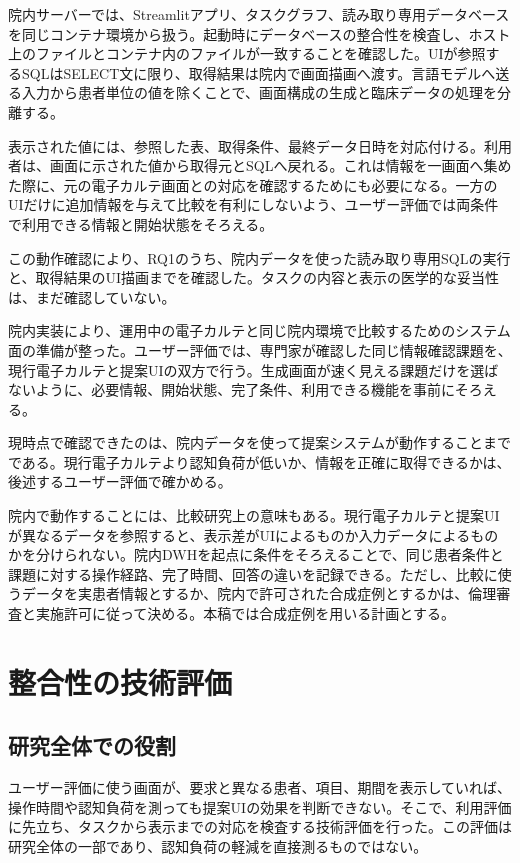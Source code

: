 \documentclass[a4paper]{jsarticle}
\begin{document}
院内サーバーでは、Streamlitアプリ、タスクグラフ、読み取り専用データベースを同じコンテナ環境から扱う。起動時にデータベースの整合性を検査し、ホスト上のファイルとコンテナ内のファイルが一致することを確認した。UIが参照するSQLはSELECT文に限り、取得結果は院内で画面描画へ渡す。言語モデルへ送る入力から患者単位の値を除くことで、画面構成の生成と臨床データの処理を分離する。

表示された値には、参照した表、取得条件、最終データ日時を対応付ける。利用者は、画面に示された値から取得元とSQLへ戻れる。これは情報を一画面へ集めた際に、元の電子カルテ画面との対応を確認するためにも必要になる。一方のUIだけに追加情報を与えて比較を有利にしないよう、ユーザー評価では両条件で利用できる情報と開始状態をそろえる。

この動作確認により、RQ1のうち、院内データを使った読み取り専用SQLの実行と、取得結果のUI描画までを確認した。タスクの内容と表示の医学的な妥当性は、まだ確認していない。

院内実装により、運用中の電子カルテと同じ院内環境で比較するためのシステム面の準備が整った。ユーザー評価では、専門家が確認した同じ情報確認課題を、現行電子カルテと提案UIの双方で行う。生成画面が速く見える課題だけを選ばないように、必要情報、開始状態、完了条件、利用できる機能を事前にそろえる。

現時点で確認できたのは、院内データを使って提案システムが動作することまでである。現行電子カルテより認知負荷が低いか、情報を正確に取得できるかは、後述するユーザー評価で確かめる。

院内で動作することには、比較研究上の意味もある。現行電子カルテと提案UIが異なるデータを参照すると、表示差がUIによるものか入力データによるものかを分けられない。院内DWHを起点に条件をそろえることで、同じ患者条件と課題に対する操作経路、完了時間、回答の違いを記録できる。ただし、比較に使うデータを実患者情報とするか、院内で許可された合成症例とするかは、倫理審査と実施許可に従って決める。本稿では合成症例を用いる計画とする。

\section{整合性の技術評価}

\subsection{研究全体での役割}

ユーザー評価に使う画面が、要求と異なる患者、項目、期間を表示していれば、操作時間や認知負荷を測っても提案UIの効果を判断できない。そこで、利用評価に先立ち、タスクから表示までの対応を検査する技術評価を行った。この評価は研究全体の一部であり、認知負荷の軽減を直接測るものではない。
\end{document}
